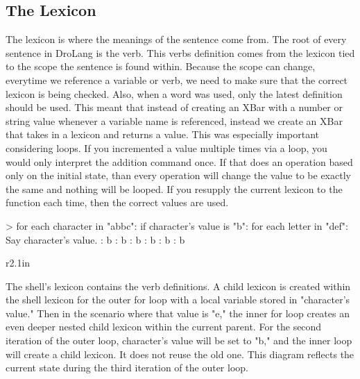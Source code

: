\documentclass[titlepage]{article}
\newcommand{\langName}{DroLang}
\begin{document}
\subsection*{The Lexicon}
The lexicon is where the meanings of the sentence come from. The root of every sentence in \langName{} is the verb. This verbs definition comes from the lexicon tied to the scope the sentence is found within. Because the scope can change, everytime we reference a variable or verb, we need to make sure that the correct lexicon is being checked. Also, when a word was used, only the latest definition should be used. This meant that instead of creating an XBar with a number or string value whenever a variable name is referenced, instead we create an XBar that takes in a lexicon and returns a value. This was especially important considering loops. If you incremented  a value multiple times via a loop, you would only interpret the addition command once. If that does an operation based only on the initial state, than every operation will change the value to be exactly the same and nothing will be looped. If you resupply the current lexicon to the function each time, then the correct values are used.

\begin{codeblock}[caption={Scope Demonstration},label={lst:scopeDemo}]
> for each character in "abbc": if character's value is "b": for each letter in "def": Say character's value.
: b
: b
: b
: b
: b
: b
\end{codeblock}

\begin{wrapfigure}[7]{r}{2.1in}
	\hspace{1em}
\end{wrapfigure}

The shell's lexicon contains the verb definitions. A child lexicon is created within the shell lexicon for the outer for loop with a local variable stored in "character's value." Then in the scenario where that value is "e," the inner for loop creates an even deeper nested child lexicon within the current parent. For the second iteration of the outer loop, character's value will be set to "b," and the inner loop will create a child lexicon. It does not reuse the old one. This diagram reflects the current state during the third iteration of the outer loop.
\end{document}
